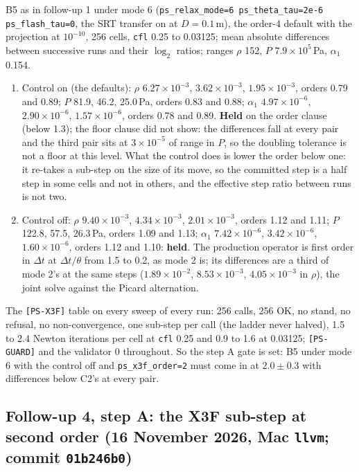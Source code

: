 \documentclass[11pt,a4paper]{article}
\newcommand{\code}[1]{\texttt{\small #1}}
\newcommand{\Dt}{\Delta t}
\begin{document}
B5 as in follow-up 1 under mode 6 (\code{ps\_relax\_mode=6
ps\_theta\_tau=2e-6 ps\_flash\_tau=0}, the SRT transfer on at
$D = 0.1$\,m), the order-4 default with the projection at $10^{-10}$,
256 cells, \code{cfl} 0.25 to 0.03125; mean absolute differences
between successive runs and their $\log_2$ ratios; ranges $\rho$ 152,
$P$ $7.9\times10^{5}$\,Pa, $\alpha_1$ 0.154.
\begin{enumerate}[nosep]
\item[C1.] Control on (the defaults): $\rho$ $6.27\times10^{-3}$,
      $3.62\times10^{-3}$, $1.95\times10^{-3}$, orders 0.79 and 0.89;
      $P$ 81.9, 46.2, 25.0\,Pa, orders 0.83 and 0.88; $\alpha_1$
      $4.97\times10^{-6}$, $2.90\times10^{-6}$, $1.57\times10^{-6}$,
      orders 0.78 and 0.89.  \textbf{Held} on the order clause (below
      1.3); the floor clause did not show: the differences fall at every
      pair and the third pair sits at $3\times10^{-5}$ of range in $P$,
      so the doubling tolerance is not a floor at this level.  What the
      control does is lower the order below one: it re-takes a sub-step
      on the size of its move, so the committed step is a half step in
      some cells and not in others, and the effective step ratio between
      runs is not two.
\item[C2.] Control off: $\rho$ $9.40\times10^{-3}$, $4.34\times10^{-3}$,
      $2.01\times10^{-3}$, orders 1.12 and 1.11; $P$ 122.8, 57.5,
      26.3\,Pa, orders 1.09 and 1.13; $\alpha_1$ $7.42\times10^{-6}$,
      $3.42\times10^{-6}$, $1.60\times10^{-6}$, orders 1.12 and 1.10:
      \textbf{held}.  The production operator is first order in $\Dt$
      at $\Dt/\theta$ from 1.5 to 0.2, as mode 2 is; its differences are
      a third of mode 2's at the same steps ($1.89\times10^{-2}$,
      $8.53\times10^{-3}$, $4.05\times10^{-3}$ in $\rho$), the joint
      solve against the Picard alternation.
\end{enumerate}
The \code{[PS-X3F]} table on every sweep of every run: 256 calls, 256
OK, no stand, no refusal, no non-convergence, one sub-step per call
(the ladder never halved), 1.5 to 2.4 Newton iterations per cell at
\code{cfl} 0.25 and 0.9 to 1.6 at 0.03125; \code{[PS-GUARD]} and the
validator 0 throughout.  So the step A gate is set: B5 under mode 6
with the control off and \code{ps\_x3f\_order=2} must come in at
$2.0\pm0.3$ with differences below C2's at every pair.


\subsection{Follow-up 4, step A: the X3F sub-step at second order (16 November 2026, Mac \code{llvm}; commit \code{01b246b0})}
\label{sec:fu4a}
\end{document}
